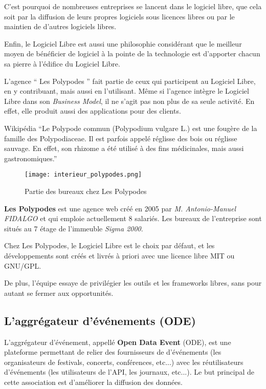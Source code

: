 C'est pourquoi de nombreuses entreprises se lancent dans le logiciel libre, que cela soit par la diffusion de leurs propres logiciels sous licences libres ou par le maintien de d'autres logiciels libres.

Enfin, le Logiciel Libre est aussi une philosophie considérant que le meilleur moyen de bénéficier de logiciel à la pointe de la technologie est d'apporter chacun sa pierre à l'édifice du Logiciel Libre.

L'agence `` Les Polypodes '' fait partie de ceux qui participent au Logiciel Libre, en y contribuant, mais aussi en l'utilisant. Même si l'agence intègre le Logiciel Libre dans son \textit{Business Model}, il ne s'agit pas non plus de sa seule activité. En effet, elle produit aussi des applications pour des clients.

\newpage

\begin{aquote}{Wikipédia}
``Le Polypode commun (Polypodium vulgare L.) est une fougère de la famille des Polypodiaceae. Il est parfois appelé réglisse des bois ou réglisse sauvage. En effet, son rhizome a été utilisé à des fins médicinales, mais aussi gastronomiques.''
\end{aquote}

\begin{figure}[H]
\begin{center}
\texttt{[image: interieur\_polypodes.png]}
\end{center}
\caption{Partie des bureaux chez Les Polypodes}
\end{figure}

\textbf{Les Polypodes} est une agence web créé en 2005 par \textit{M. Antonio-Manuel FIDALGO} et qui emploie actuellement 8 salariés. Les bureaux de l'entreprise sont situés au 7 étage de l'immeuble \textit{Sigma 2000}.

Chez Les Polypodes, le Logiciel Libre est le choix par défaut, et les développements sont créés et livrés à priori avec une licence libre MIT ou GNU/GPL.

De plus, l'équipe essaye de privilégier les outils et les frameworks libres, sans pour autant se fermer aux opportunités.

\subsection{L'aggrégateur d'événements (ODE)}

L'aggrégateur d'événement, appellé \textbf{Open Data Event} (ODE), est une plateforme permettant de relier des fournisseurs de d'événements  (les organisateurs de festivals, concerts, conférences, etc...) avec les réutilisateurs d’événements (les utilisateurs de l’API, les journaux, etc...). Le but principal de cette association est d'améliorer la diffusion des données.

